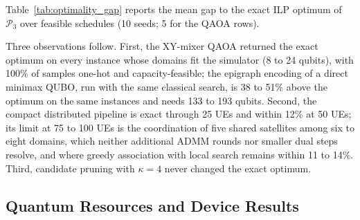 Table~\ref{tab:optimality_gap} reports the mean gap to the exact ILP optimum of $\mathscr{P}_3$ over feasible
schedules (10 seeds; 5 for the QAOA rows).
\begin{table}[!t]
\centering
\caption{Mean Optimality Gap (\%) Above the Exact ILP Optimum of $\mathscr{P}_3$}
\label{tab:optimality_gap}
\footnotesize
{}
\end{table}
Three observations follow. First, the XY-mixer QAOA returned the exact optimum on every instance whose domains fit the
simulator (8 to 24 qubits), with 100\% of samples one-hot and capacity-feasible; the epigraph encoding of a direct
minimax QUBO, run with the same classical search, is 38 to 51\% above the optimum on the same instances and needs 133 to
193 qubits. Second, the compact distributed pipeline is exact through 25 UEs and within 12\% at 50 UEs; its limit at
75 to 100 UEs is the coordination of five shared satellites among six to eight domains, which neither additional ADMM
rounds nor smaller dual steps resolve, and where greedy association with local search remains within 11 to 14\%.
Third, candidate pruning with $\kappa=4$ never changed the exact optimum.

\subsection{Quantum Resources and Device Results}

